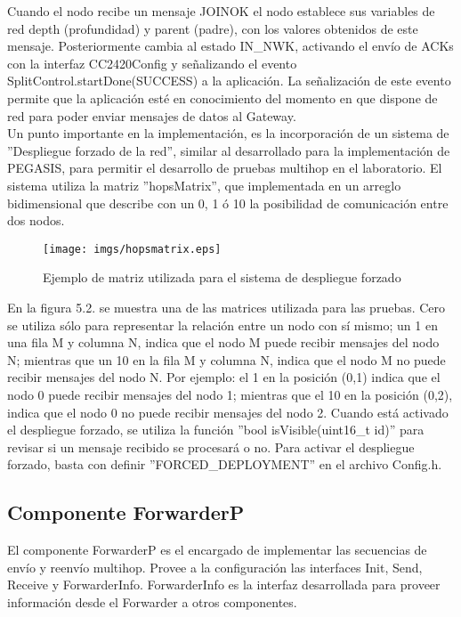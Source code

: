 Cuando el nodo recibe un mensaje JOIN\textunderscore OK el nodo establece sus variables de red depth (profundidad) y parent (padre), con los valores obtenidos de este mensaje. Posteriormente cambia al estado IN\_NWK, activando el envío de ACKs con la interfaz CC2420Config y señalizando el evento SplitControl.startDone(SUCCESS) a la aplicación. La señalización de este evento permite que la aplicación esté en conocimiento del momento en que dispone de red para poder enviar mensajes de datos al Gateway.\\

Un punto importante en la implementación, es la incorporación de un sistema de ''Despliegue forzado de la red'', similar al desarrollado para la implementación de PEGASIS, para permitir el desarrollo de pruebas multihop en el laboratorio. El sistema utiliza la matriz ''hopsMatrix'', que implementada en un arreglo bidimensional que describe con un 0, 1 ó 10 la posibilidad de comunicación entre dos nodos. 

\begin{figure}[H]
	\centering
 	\texttt{[image: imgs/hopsmatrix.eps]} 
 	\caption{Ejemplo de matriz utilizada para el sistema de despliegue forzado }
\end{figure}

En la figura 5.2. se muestra una de las matrices utilizada para las pruebas. Cero se utiliza sólo para representar la relación entre un nodo con sí mismo; un 1 en una fila M y columna N, indica que el nodo M puede recibir mensajes del nodo N; mientras que un 10 en la fila M y columna N, indica que el nodo M no puede recibir mensajes del nodo N. Por ejemplo: el 1 en la posición (0,1) indica que el nodo 0 puede recibir mensajes del nodo 1; mientras que el 10 en la posición (0,2), indica que el nodo 0 no puede recibir mensajes del nodo 2. Cuando está activado el despliegue forzado, se utiliza la función ''bool isVisible(uint16\_t id)'' para revisar si un mensaje recibido se procesará o no. Para activar el despliegue forzado, basta con definir ''FORCED\_DEPLOYMENT'' en el archivo Config.h.

\subsection{Componente ForwarderP}
El componente ForwarderP es el encargado de implementar las secuencias de envío y reenvío multihop. Provee a la configuración las interfaces Init, Send, Receive y ForwarderInfo. ForwarderInfo es la interfaz desarrollada para proveer información desde el Forwarder a otros componentes.

